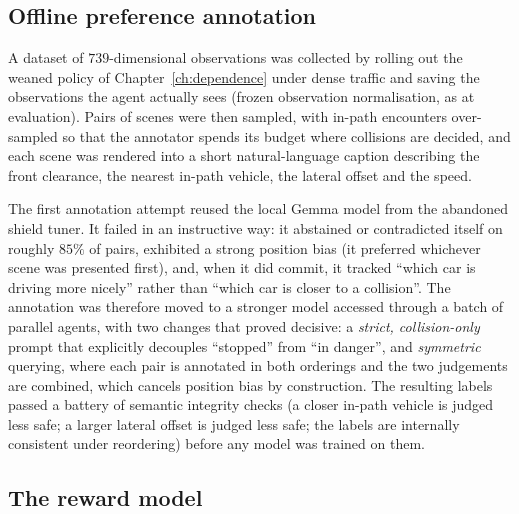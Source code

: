 \subsection{Offline preference annotation}

A dataset of \(739\)-dimensional observations was collected by rolling out the weaned policy of
Chapter~\ref{ch:dependence} under dense traffic and saving the observations the agent actually
sees (frozen observation normalisation, as at evaluation). Pairs of scenes were then sampled,
with in-path encounters over-sampled so that the annotator spends its budget where collisions are
decided, and each scene was rendered into a short natural-language caption describing the front
clearance, the nearest in-path vehicle, the lateral offset and the speed.

The first annotation attempt reused the local Gemma model from the abandoned shield tuner. It
failed in an instructive way: it abstained or contradicted itself on roughly \(85\%\) of pairs,
exhibited a strong position bias (it preferred whichever scene was presented first), and, when it
did commit, it tracked ``which car is driving more nicely'' rather than ``which car is closer to a
collision''. The annotation was therefore moved to a stronger model accessed through a batch of
parallel agents, with two changes that proved decisive: a \emph{strict, collision-only} prompt
that explicitly decouples ``stopped'' from ``in danger'', and \emph{symmetric} querying, where
each pair is annotated in both orderings and the two judgements are combined, which cancels
position bias by construction. The resulting labels passed a battery of semantic integrity
checks (a closer in-path vehicle is judged less safe; a larger lateral offset is judged less
safe; the labels are internally consistent under reordering) before any model was trained on them.

\subsection{The reward model}

